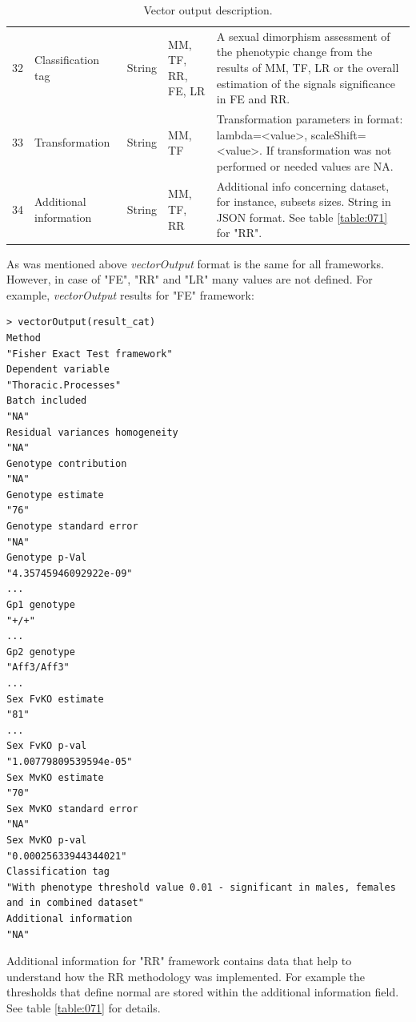 \documentclass[12pt,a4paper]{article}
\begin{document}
\begin{table}
\begin{tabular}{| l | l | l | l | p{10cm} |}
32&Classification tag&String&MM, TF, RR, FE, LR&A sexual dimorphism assessment of the phenotypic change from the results of MM, TF, LR or the overall estimation of the signals significance in FE and RR.\\
33&Transformation&String&MM, TF&Transformation parameters in format: lambda=<value>, scaleShift=<value>. If transformation was not performed or needed values are NA.\\
34&Additional information&String&MM, TF, RR&Additional info concerning dataset, for instance, subsets sizes. String in JSON format. See table \ref{table:071} for "RR".\\
\hline  
\end{tabular}
\caption{Vector output description.}\label{table:07}
\end{table}

As was mentioned above \textit{vectorOutput} format is the same for all frameworks. However, in case of "FE", "RR" and "LR" many values are not defined. For example, \textit{vectorOutput} results for "FE" framework:

\begingroup
\fontsize{8pt}{12pt}\selectfont
\begin{verbatim}
> vectorOutput(result_cat)
Method 
"Fisher Exact Test framework" 
Dependent variable 
"Thoracic.Processes" 
Batch included 
"NA" 
Residual variances homogeneity 
"NA" 
Genotype contribution 
"NA" 
Genotype estimate 
"76" 
Genotype standard error 
"NA" 
Genotype p-Val 
"4.35745946092922e-09" 
...
Gp1 genotype 
"+/+" 
...
Gp2 genotype 
"Aff3/Aff3" 
...
Sex FvKO estimate 
"81" 
...
Sex FvKO p-val 
"1.00779809539594e-05" 
Sex MvKO estimate 
"70" 
Sex MvKO standard error 
"NA" 
Sex MvKO p-val 
"0.00025633944344021" 
Classification tag 
"With phenotype threshold value 0.01 - significant in males, females and in combined dataset" 
Additional information 
"NA" 

\end{verbatim}
\endgroup

Additional information for "RR" framework contains data that help to understand how the RR methodology was implemented. For example the thresholds that define normal are stored within the additional information field. See table \ref{table:071} for details. 
\end{document}
